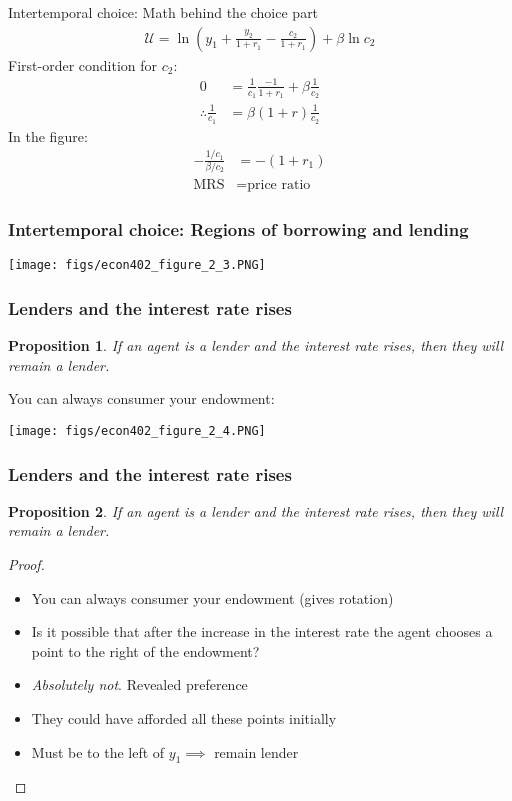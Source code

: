 \documentclass[presentation,dvipsnames]{beamer}
\newtheorem{prop}{Proposition}
\begin{document}
\begin{frame}[label=sec-2-1]{Intertemporal choice: Math behind the choice part}
\begin{align*}
\mathcal{U} = \ln \left( y_{1} + \frac{y_{2}}{1+r_{1}} - \frac{c_{2}}{1+r_{1}} \right) +
\beta \ln c_{2}
\end{align*}
First-order condition for $c_{2}$:
\begin{align*}
0 &= \frac{1}{c_{1}} \frac{-1}{1+r_{1}} + \beta \frac{1}{c_{2}} \\
\therefore \frac{1}{c_{1}} &= \beta (1+r) \frac{1}{c_{2}}
\end{align*}
In the figure:
\begin{align*}
- \frac{1 / c_{1}}{\beta / c_{2}} &= - (1+r_{1}) \\
\text{MRS} &= \text{price ratio}
\end{align*}
\end{frame}

\begin{frame}
\frametitle{Intertemporal choice: Regions of borrowing and lending}
\centerline{\texttt{[image: figs/econ402\_figure\_2\_3.PNG]}}
\end{frame}

\begin{frame}
\frametitle{Lenders and the interest rate rises}
\begin{prop}
\label{prop:1}
If an agent is a lender and the interest rate rises,
then they will remain a lender.
\end{prop}
You can always consumer your endowment:
\centerline{\texttt{[image: figs/econ402\_figure\_2\_4.PNG]}}
\end{frame}

\begin{frame}
\frametitle{Lenders and the interest rate rises}
\begin{prop}
\label{prop:1}
If an agent is a lender and the interest rate rises,
then they will remain a lender.
\end{prop}

\begin{proof}
\begin{itemize}[label={--}]
\item You can always consumer your endowment (gives rotation)
\item Is it possible that after the increase in the interest rate the agent chooses a point to the right of the endowment?
\item \emph{Absolutely not}. Revealed preference
\item They could have afforded all these points initially
\item Must be to the left of $y_{1} \implies$ remain lender
\end{itemize}
\end{proof}
\end{frame}
\end{document}
